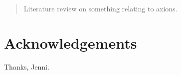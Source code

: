 





\begin{abstract}
	Literature review on something relating to axions.
\end{abstract}

\tableofcontents
\newpage
{}

\setcounter{chapter}{-1}









\section*{Acknowledgements}

Thanks, Jenni.

\begingroup
\let\clearpage\relax
{}
\printbibliography
\endgroup





